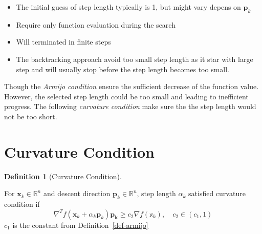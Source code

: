 \documentclass[
  letterpaper,
  DIV=11,
  numbers=noendperiod]{scrreprt}
\providecommand{\tightlist}{%
  \setlength{\itemsep}{0pt}\setlength{\parskip}{0pt}}
\theoremstyle{definition}
\newtheorem{definition}{Definition}[chapter]
\theoremstyle{plain}
\theoremstyle{plain}
\theoremstyle{definition}
\theoremstyle{plain}
\theoremstyle{plain}
\theoremstyle{remark}
\begin{document}
\begin{tcolorbox}[enhanced jigsaw, bottomrule=.15mm, title=\textcolor{quarto-callout-note-color}{\faInfo}\hspace{0.5em}{Note}, left=2mm, colback=white, toprule=.15mm, bottomtitle=1mm, titlerule=0mm, leftrule=.75mm, colbacktitle=quarto-callout-note-color!10!white, opacitybacktitle=0.6, coltitle=black, colframe=quarto-callout-note-color-frame, rightrule=.15mm, breakable, toptitle=1mm, arc=.35mm, opacityback=0]

\begin{itemize}
\tightlist
\item
  The initial guess of step length typically is 1, but might vary depens
  on \(\mathbf{p}_k\)
\item
  Require only function evaluation during the search
\item
  Will terminated in finite steps
\item
  The backtracking approach avoid too small step length as it star with
  large step and will usually stop before the step length becomes too
  small.
\end{itemize}

\end{tcolorbox}

Though the \emph{Armijo condition} ensure the sufficient decrease of the
function value. However, the selected step length could be too small and
leading to inefficient progress. The following \emph{curvature
condition} make sure the the step length would not be too short.

\section{Curvature Condition}\label{curvature-condition}

\begin{definition}[Curvature
Condition]\protect\hypertarget{def-curvature}{}\label{def-curvature}

For \(\mathbf{x}_k\in\mathbb{R}^n\) and descent direction
\(\mathbf{p}_k\in\mathbb{R}^n\), step length \(\alpha_k\) satisfied
curvature condition if \[
\nabla^Tf(\mathbf{x}_k+\alpha_k\mathbf{p}_k)\mathbf{p_k}\geq c_2\nabla f(\mathbb{x}_k),\quad c_2\in(c_1, 1)
\] \(c_1\) is the constant from Definition~\ref{def-armijo}

\end{definition}
\end{document}
